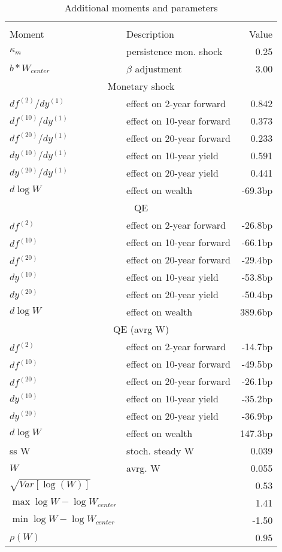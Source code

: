 \begin{table}[htbp]\centering  
 \bgroup  
 \def\arraystretch{1.25}\caption{Additional moments and parameters} 
\begin{tabular}{llr} 
\hline\hline 
\multicolumn{3}{c}{} \\ 
Moment & Description & Value  \\ 
$\kappa_m$ & persistence mon. shock  & 0.25   \\ 
$b*W_{center}$ & $\beta$ adjustment  & 3.00   \\ 
\hline 
\multicolumn{3}{c}{Monetary shock} \\ 
$df^{(2)}/dy^{(1)} $ & effect on 2-year forward  & 0.842 \\ 
$df^{(10)}/dy^{(1)} $ & effect on 10-year forward  & 0.373 \\ 
$df^{(20)}/dy^{(1)} $ & effect on 20-year forward  & 0.233 \\ 
$dy^{(10)}/dy^{(1)} $ & effect on 10-year yield  & 0.591 \\ 
$dy^{(20)}/dy^{(1)} $ & effect on 20-year yield  & 0.441 \\ 
$d\log W$ & effect on wealth  & -69.3bp \\ 
\hline 
\multicolumn{3}{c}{QE} \\ 
$df^{(2)}$ & effect on 2-year forward  & -26.8bp \\ 
$df^{(10)}$ & effect on 10-year forward  & -66.1bp \\ 
$df^{(20)}$ & effect on 20-year forward  & -29.4bp \\ 
$dy^{(10)}$ & effect on 10-year yield  & -53.8bp \\ 
$dy^{(20)}$ & effect on 20-year yield  & -50.4bp \\ 
$d\log W$ & effect on wealth  & 389.6bp \\ 
\hline 
\multicolumn{3}{c}{QE (avrg W)} \\ 
$df^{(2)} $ & effect on 2-year forward  & -14.7bp \\ 
$df^{(10)} $ & effect on 10-year forward  & -49.5bp \\ 
$df^{(20)} $ & effect on 20-year forward  & -26.1bp \\ 
$dy^{(10)} $ & effect on 10-year yield  & -35.2bp \\ 
$dy^{(20)} $ & effect on 20-year yield  & -36.9bp \\ 
$d\log W$ & effect on wealth  & 147.3bp \\ 
\hline 
ss W & stoch. steady W & 0.039   \\ 
$W$ & avrg. W & 0.055   \\ 
$\sqrt{Var[\log(W)]}$ &  & 0.53   \\ 
$\max \log W - \log W_{center} $ &  & 1.41   \\ 
$\min \log W - \log W_{center} $ &  & -1.50   \\ 
$\rho(W)$ &  & 0.95   \\ 
\hline 
\hline\hline 
\end{tabular} 
 \egroup 
\end{table} 
